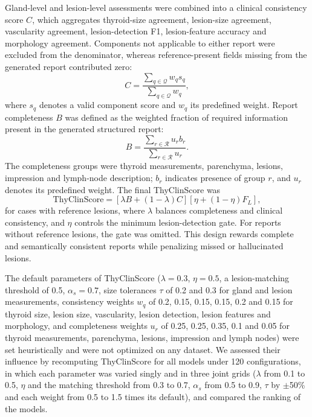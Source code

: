 \documentclass[fleqn,10pt]{wlscirep}
\begin{document}
Gland-level and lesion-level assessments were combined into a clinical consistency score \(C\), which aggregates thyroid-size agreement, lesion-size agreement, vascularity agreement, lesion-detection F1, lesion-feature accuracy and morphology agreement. Components not applicable to either report were excluded from the denominator, whereas reference-present fields missing from the generated report contributed zero:
\[
C=\frac{\sum_{q\in\mathcal{Q}}w_qs_q}{\sum_{q\in\mathcal{Q}}w_q},
\]
where \(s_q\) denotes a valid component score and \(w_q\) its predefined weight. Report completeness \(B\) was defined as the weighted fraction of required information present in the generated structured report:
\[
B=\frac{\sum_{r\in\mathcal{R}}u_rb_r}{\sum_{r\in\mathcal{R}}u_r}.
\]
The completeness groups were thyroid measurements, parenchyma, lesions, impression and lymph-node description; \(b_r\) indicates presence of group \(r\), and \(u_r\) denotes its predefined weight. The final ThyClinScore was
\[
\mathrm{ThyClinScore}=
\left[\lambda B+(1-\lambda)C\right]
\left[\eta+(1-\eta)F_L\right],
\]
for cases with reference lesions, where \(\lambda\) balances completeness and clinical consistency, and \(\eta\) controls the minimum lesion-detection gate. For reports without reference lesions, the gate was omitted. This design rewards complete and semantically consistent reports while penalizing missed or hallucinated lesions.

The default parameters of ThyClinScore (\(\lambda=0.3\), \(\eta=0.5\), a lesion-matching threshold of 0.5, \(\alpha_s=0.7\), size tolerances \(\tau\) of 0.2 and 0.3 for gland and lesion measurements, consistency weights \(w_q\) of 0.2, 0.15, 0.15, 0.15, 0.2 and 0.15 for thyroid size, lesion size, vascularity, lesion detection, lesion features and morphology, and completeness weights \(u_r\) of 0.25, 0.25, 0.35, 0.1 and 0.05 for thyroid measurements, parenchyma, lesions, impression and lymph nodes) were set heuristically and were not optimized on any dataset. We assessed their influence by recomputing ThyClinScore for all models under 120 configurations, in which each parameter was varied singly and in three joint grids (\(\lambda\) from 0.1 to 0.5, \(\eta\) and the matching threshold from 0.3 to 0.7, \(\alpha_s\) from 0.5 to 0.9, \(\tau\) by \(\pm\)50\% and each weight from 0.5 to 1.5 times its default), and compared the ranking of the models.
\end{document}
